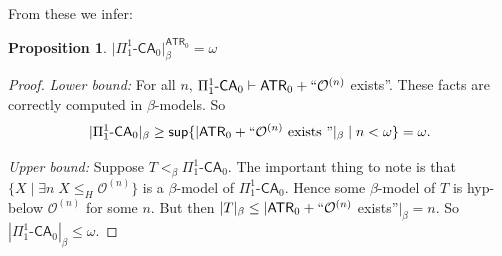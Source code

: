 \documentclass{amsart}
\newtheorem{proposition}[proposition]{Proposition}
\theoremstyle{remark}
\newcommand{\ATR}{\mathsf{ATR}}
\begin{document}
From these we infer:
\begin{proposition}
$\lvert\Pi^1_1\text{-}\mathsf{CA}_0\rvert^{\ATR_0}_\beta=\omega$
\end{proposition}
\begin{proof}

    \emph{Lower bound:} For all $n$, $\Pi^1_1\text{-}\mathsf{CA}_0\vdash\mathsf{ATR}_0+``\mathcal{O}^{(n)}$ exists''. These facts are correctly computed in $\beta$-models. So $$|\Pi^1_1\text{-}\mathsf{CA}_0|_\beta \geq \mathsf{sup}\{|\mathsf{ATR}_0+``\mathcal{O}^{(n)}\text{ exists ''}|_\beta \mid n<\omega \}=\omega.$$ 
    
    \emph{Upper bound:} Suppose $T<_\beta \Pi^1_1\text{-}\mathsf{CA}_0$. The important thing to note is that $\{ X \mid \exists n\; X\leq_H \mathcal{O}^{(n)}\}$ is a $\beta$-model of $\Pi^1_1\text{-}\mathsf{CA}_0$. Hence some $\beta$-model of $T$ is hyp-below $\mathcal{O}^{(n)}$ for some $n$. But then $|T|_\beta \leq |\mathsf{ATR}_0+``\mathcal{O}^{(n)}$ exists''$ |_\beta = n$. So $|\Pi^1_1\text{-}\mathsf{CA}_0|_\beta \leq \omega$.
\end{proof}
\end{document}
